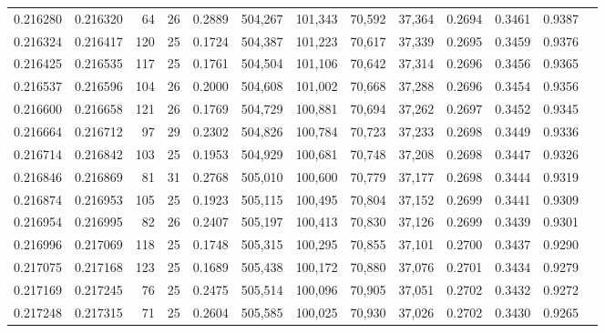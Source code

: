 \begin{tabular}{rrrrrrrrrrrrr}
0.216280 & 0.216320 &  64 &  26 &                                     0.2889 & 504,267 & 101,343 &  70,592 &  37,364 & 0.2694 & 0.3461 & 0.9387 \\
0.216324 & 0.216417 & 120 &  25 &                                     0.1724 & 504,387 & 101,223 &  70,617 &  37,339 & 0.2695 & 0.3459 & 0.9376 \\
0.216425 & 0.216535 & 117 &  25 &                                     0.1761 & 504,504 & 101,106 &  70,642 &  37,314 & 0.2696 & 0.3456 & 0.9365 \\
0.216537 & 0.216596 & 104 &  26 &                                     0.2000 & 504,608 & 101,002 &  70,668 &  37,288 & 0.2696 & 0.3454 & 0.9356 \\
0.216600 & 0.216658 & 121 &  26 &                                     0.1769 & 504,729 & 100,881 &  70,694 &  37,262 & 0.2697 & 0.3452 & 0.9345 \\
0.216664 & 0.216712 &  97 &  29 &                                     0.2302 & 504,826 & 100,784 &  70,723 &  37,233 & 0.2698 & 0.3449 & 0.9336 \\
0.216714 & 0.216842 & 103 &  25 &                                     0.1953 & 504,929 & 100,681 &  70,748 &  37,208 & 0.2698 & 0.3447 & 0.9326 \\
0.216846 & 0.216869 &  81 &  31 &                                     0.2768 & 505,010 & 100,600 &  70,779 &  37,177 & 0.2698 & 0.3444 & 0.9319 \\
0.216874 & 0.216953 & 105 &  25 &                                     0.1923 & 505,115 & 100,495 &  70,804 &  37,152 & 0.2699 & 0.3441 & 0.9309 \\
0.216954 & 0.216995 &  82 &  26 &                                     0.2407 & 505,197 & 100,413 &  70,830 &  37,126 & 0.2699 & 0.3439 & 0.9301 \\
0.216996 & 0.217069 & 118 &  25 &                                     0.1748 & 505,315 & 100,295 &  70,855 &  37,101 & 0.2700 & 0.3437 & 0.9290 \\
0.217075 & 0.217168 & 123 &  25 &                                     0.1689 & 505,438 & 100,172 &  70,880 &  37,076 & 0.2701 & 0.3434 & 0.9279 \\
0.217169 & 0.217245 &  76 &  25 &                                     0.2475 & 505,514 & 100,096 &  70,905 &  37,051 & 0.2702 & 0.3432 & 0.9272 \\
0.217248 & 0.217315 &  71 &  25 &                                     0.2604 & 505,585 & 100,025 &  70,930 &  37,026 & 0.2702 & 0.3430 & 0.9265 \\

\end{tabular}
